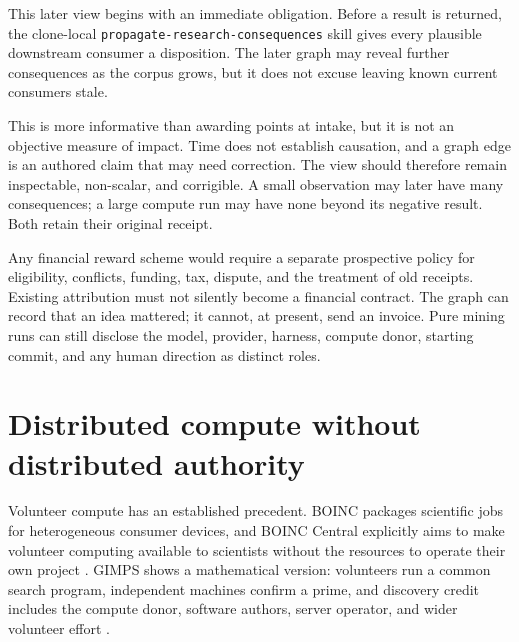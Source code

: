 \documentclass[10pt]{article}
\begin{document}
This later view begins with an immediate obligation. Before a result is
returned, the clone-local \texttt{propagate-research-consequences} skill gives
every plausible downstream consumer a disposition. The later graph may reveal
further consequences as the corpus grows, but it does not excuse leaving known
current consumers stale.

This is more informative than awarding points at intake, but it is not an
objective measure of impact.  Time does not establish causation, and a graph
edge is an authored claim that may need correction.  The view should therefore
remain inspectable, non-scalar, and corrigible.  A small observation may later
have many consequences; a large compute run may have none beyond its negative
result.  Both retain their original receipt.

Any financial reward scheme would require a separate prospective policy for
eligibility, conflicts, funding, tax, dispute, and the treatment of old
receipts.  Existing attribution must not silently become a financial contract.
The graph can record that an idea mattered; it cannot, at present, send an
invoice.  Pure mining runs can still disclose the model, provider, harness,
compute donor, starting commit, and any human direction as distinct roles.

\section{Distributed compute without distributed authority}\label{sec:security}

Volunteer compute has an established precedent.  BOINC packages scientific
jobs for heterogeneous consumer devices, and BOINC Central explicitly aims to
make volunteer computing available to scientists without the resources to
operate their own project \cite{boinc}.  GIMPS shows a mathematical version:
volunteers run a common search program, independent machines confirm a prime,
and discovery credit includes the compute donor, software authors, server
operator, and wider volunteer effort \cite{gimps}.
\end{document}
